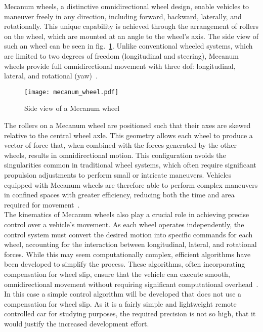 Mecanum wheels, a distinctive omnidirectional wheel design, enable vehicles to maneuver freely in any direction, including forward, backward, laterally, and rotationally. This unique capability is achieved through the arrangement of rollers on the wheel, which are mounted at an angle to the wheel's axis. The side view of such an wheel can be seen in fig.~\ref{fig:mecanumwheel}. Unlike conventional wheeled systems, which are limited to two degrees of freedom (longitudinal and steering), Mecanum wheels provide full omnidirectional movement with three \ac{dof}: longitudinal, lateral, and rotational (yaw)~\cite{Dickerson.1991}.\\
\begin{figure}[h]
	\centering
	\captionsetup{justification=centering}
	\texttt{[image: mecanum\_wheel.pdf]}
	\caption{Side view of a Mecanum wheel~\cite{Dickerson.1991}}
	\label{fig:mecanumwheel}
\end{figure}
The rollers on a Mecanum wheel are positioned such that their axes are skewed relative to the central wheel axle. This geometry allows each wheel to produce a vector of force that, when combined with the forces generated by the other wheels, results in omnidirectional motion. This configuration avoids the singularities common in traditional wheel systems, which often require significant propulsion adjustments to perform small or intricate maneuvers. Vehicles equipped with Mecanum wheels are therefore able to perform complex maneuvers in confined spaces with greater efficiency, reducing both the time and area required for movement~\cite{Dickerson.1991}.\\
The kinematics of Mecanum wheels also play a crucial role in achieving precise control over a vehicle’s movement. As each wheel operates independently, the control system must convert the desired motion into specific commands for each wheel, accounting for the interaction between longitudinal, lateral, and rotational forces. While this may seem computationally complex, efficient algorithms have been developed to simplify the process. These algorithms, often incorporating compensation for wheel slip, ensure that the vehicle can execute smooth, omnidirectional movement without requiring significant computational overhead~\cite{Dickerson.1991}. In this case a simple control algorithm will be developed that does not use a compensation for wheel slip. As it is a fairly simple and lightweight remote controlled car for studying purposes, the required precision is not so high, that it would justify the increased development effort.\\
